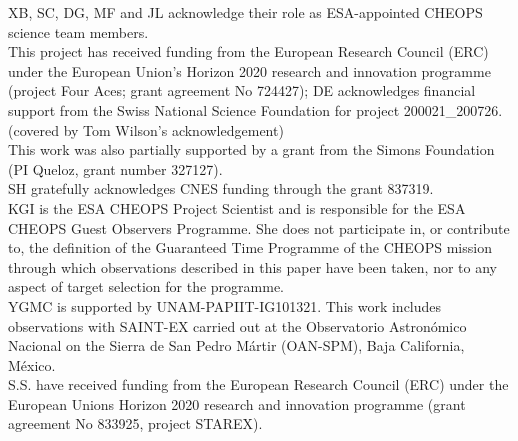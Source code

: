 XB, SC, DG, MF and JL acknowledge their role as ESA-appointed CHEOPS science team members.\\ %
This project has received funding from the European Research Council (ERC) under the European Union’s Horizon 2020 research and innovation programme (project {\sc Four Aces}; grant agreement No 724427); DE acknowledges financial support from the Swiss National Science Foundation for project 200021\_200726.\\ %
(covered by Tom Wilson's acknowledgement)\\ %
This work was also partially supported by a grant from the Simons Foundation (PI Queloz, grant number 327127).\\ %
SH gratefully acknowledges CNES funding through the grant 837319.\\ %
KGI is the ESA CHEOPS Project Scientist and is responsible for the ESA CHEOPS Guest Observers Programme. She does not participate in, or contribute to, the definition of the Guaranteed Time Programme of the CHEOPS mission through which observations described in this paper have been taken, nor to any aspect of target selection for the programme.\\ %
YGMC is supported by UNAM-PAPIIT-IG101321. This work includes observations with SAINT-EX carried out at the Observatorio Astronómico Nacional on the Sierra de San Pedro M\'artir (OAN-SPM), Baja California, M\'exico.\\ %
S.S. have received funding from the European Research Council (ERC) under the European Unions Horizon 2020 research and innovation programme (grant agreement No 833925,  project STAREX).\\ %